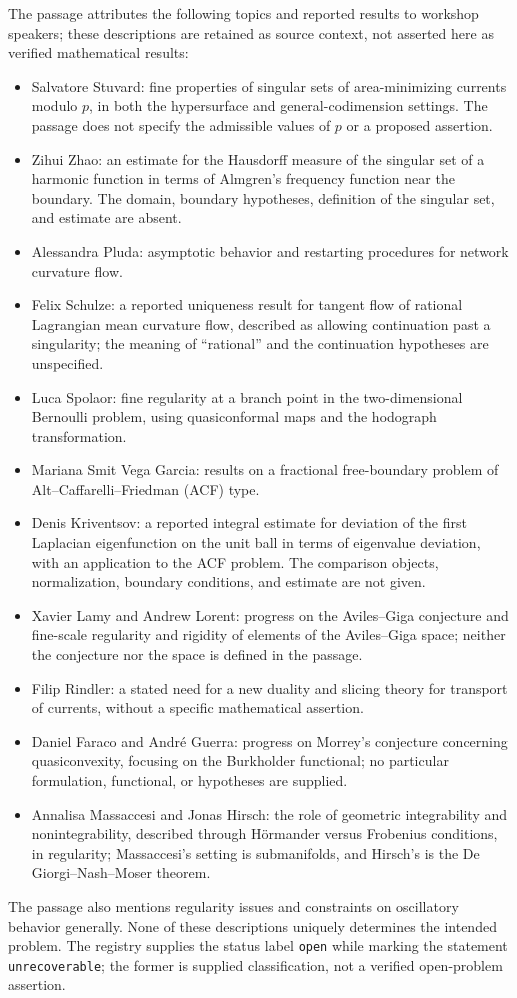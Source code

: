 \documentclass[11pt]{article}
\begin{document}
The passage attributes the following topics and reported results to workshop speakers; these descriptions are retained as source context, not asserted here as verified mathematical results:
\begin{itemize}
\item Salvatore Stuvard: fine properties of singular sets of area-minimizing currents modulo \(p\), in both the hypersurface and general-codimension settings. The passage does not specify the admissible values of \(p\) or a proposed assertion.
\item Zihui Zhao: an estimate for the Hausdorff measure of the singular set of a harmonic function in terms of Almgren's frequency function near the boundary. The domain, boundary hypotheses, definition of the singular set, and estimate are absent.
\item Alessandra Pluda: asymptotic behavior and restarting procedures for network curvature flow.
\item Felix Schulze: a reported uniqueness result for tangent flow of rational Lagrangian mean curvature flow, described as allowing continuation past a singularity; the meaning of ``rational'' and the continuation hypotheses are unspecified.
\item Luca Spolaor: fine regularity at a branch point in the two-dimensional Bernoulli problem, using quasiconformal maps and the hodograph transformation.
\item Mariana Smit Vega Garcia: results on a fractional free-boundary problem of Alt--Caffarelli--Friedman (ACF) type.
\item Denis Kriventsov: a reported integral estimate for deviation of the first Laplacian eigenfunction on the unit ball in terms of eigenvalue deviation, with an application to the ACF problem. The comparison objects, normalization, boundary conditions, and estimate are not given.
\item Xavier Lamy and Andrew Lorent: progress on the Aviles--Giga conjecture and fine-scale regularity and rigidity of elements of the Aviles--Giga space; neither the conjecture nor the space is defined in the passage.
\item Filip Rindler: a stated need for a new duality and slicing theory for transport of currents, without a specific mathematical assertion.
\item Daniel Faraco and Andr\'e Guerra: progress on Morrey's conjecture concerning quasiconvexity, focusing on the Burkholder functional; no particular formulation, functional, or hypotheses are supplied.
\item Annalisa Massaccesi and Jonas Hirsch: the role of geometric integrability and nonintegrability, described through H\"ormander versus Frobenius conditions, in regularity; Massaccesi's setting is submanifolds, and Hirsch's is the De Giorgi--Nash--Moser theorem.
\end{itemize}
The passage also mentions regularity issues and constraints on oscillatory behavior generally. None of these descriptions uniquely determines the intended problem. The registry supplies the status label \texttt{open} while marking the statement \texttt{unrecoverable}; the former is supplied classification, not a verified open-problem assertion.
\end{document}
